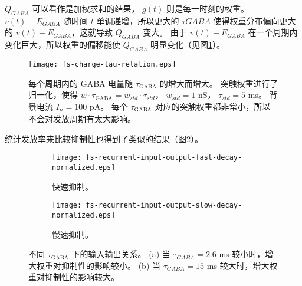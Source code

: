$Q_{GABA}$ 可以看作是加权求和的结果， $g\left(t\right)$ 则是每一时刻的权重。 $v\left(t\right) - E_{GABA}$ 随时间 $t$ 单调递增，所以更大的 $\tau{GABA}$ 使得权重分布偏向更大的 $v\left(t\right) - E_{GABA}$，这就导致 $Q_{GABA}$ 变大。
由于 $v\left(t\right) - E_{GABA}$ 在一个周期内变化巨大，所以权重的偏移能使 $Q_{GABA}$ 明显变化（见图\ref{figure:fs-neuron-tau-charge}）。 

\begin{figure}
\texttt{[image: fs-charge-tau-relation.eps]}
\caption{每个周期内的 GABA 电量随 $\tau_\text{GABA}$ 的增大而增大。
突触权重进行了归一化，使得 $w \cdot \tau_\text{GABA} = w_{std} \cdot \tau_{std}$， $w_{std} = 1$ nS， $\tau_{std} = 5$ ms。
背景电流 $I_{\mu} = 100$ pA。
每个 $\tau_\text{GABA}$ 对应的突触权重都非常小，所以不会对发放周期有太大影响。}
\label{figure:fs-neuron-tau-charge}
\end{figure}

统计发放率来比较抑制性也得到了类似的结果（图\ref{figure:fs-neuron-inhibition}）。

\begin{figure}
    \begin{subfigure}{0.5\textwidth}
        \texttt{[image: fs-recurrent-input-output-fast-decay-normalized.eps]}
        \caption{快速抑制。}
    \end{subfigure}
    \begin{subfigure}{0.5\textwidth}
        \texttt{[image: fs-recurrent-input-output-slow-decay-normalized.eps]}
        \caption{慢速抑制。}
    \end{subfigure}
\caption{不同 $\tau_\text{GABA}$ 下的输入输出关系。
(a) 当 $\tau_{GABA} = 2.6$ ms 较小时，增大权重对抑制性的影响较小。
(b) 当 $\tau_{GABA} = 15$ ms 较大时，增大权重对抑制性的影响较大。}
\label{figure:fs-neuron-inhibition}
\end{figure}

